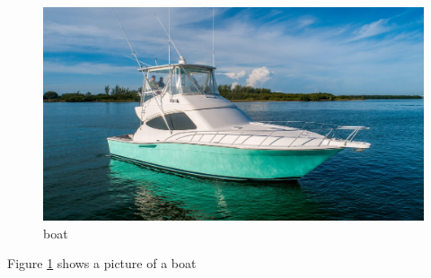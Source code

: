 \documentclass{article}
\begin{document}
	\begin{figure}
	\includegraphics [width=\linewidth]{boat.jpg}
		\caption{boat}
		\label{fig:boat1}
	\end{figure}
Figure \ref{fig:boat1} shows a picture of a boat 
\end{document}
